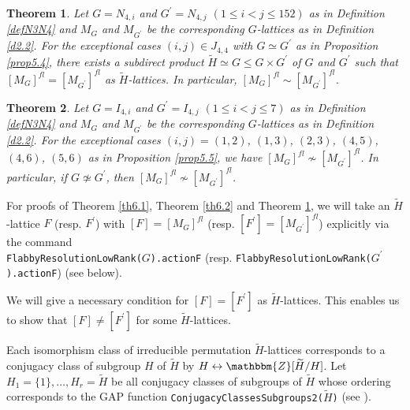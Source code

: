 \documentclass{amsart}
\theoremstyle{plain}
\newtheorem{theorem}{Theorem}[section]
\theoremstyle{definition}
\theoremstyle{remark}
\newcommand{\bZ}{\mathbbm{Z}}\newcommand{\bQ}{\mathbbm{Q}}
\newcounter{sub}\def\tr{\mbox{tr }}
\begin{document}
\begin{theorem}\label{th6.3}
Let $G=N_{4,i}$ and $G^\prime=N_{4,j}$ $(1\leq i<j\leq 152)$ 
as in Definition \ref{defN3N4} 
and $M_G$ and $M_{G^\prime}$ 
be the corresponding $G$-lattices as in Definition \ref{d2.2}. 
For the exceptional cases $(i,j)\in J_{4,4}$ with $G\simeq G^\prime$ 
as in Proposition \ref{prop5.4}, 
there exists a subdirect product 
$\widetilde{H}\simeq G\leq G\times G^\prime$ of $G$ and $G^\prime$ 
such that $[M_G]^{fl}=[M_{G^\prime}]^{fl}$ as $\widetilde{H}$-lattices. 
In particular, $[M_G]^{fl}\sim [M_{G^\prime}]^{fl}$.
\end{theorem}

\begin{theorem}\label{th6.4}
Let $G=I_{4,i}$ and $G^\prime=I_{4,j}$ $(1\leq i<j\leq 7)$ 
as in Definition \ref{defN3N4} 
and $M_G$ and $M_{G^\prime}$ 
be the corresponding $G$-lattices as in Definition \ref{d2.2}. 
For the exceptional cases 
$(i,j)=(1,2)$, $(1,3)$, $(2,3)$, $(4,5)$, $(4,6)$, $(5,6)$ 
as in Proposition \ref{prop5.5}, 
we have $[M_G]^{fl}\not\sim [M_{G^\prime}]^{fl}$. 
In particular, if $G\not\simeq G^\prime$, 
then $[M_G]^{fl}\not\sim [M_{G^\prime}]^{fl}$. 
\end{theorem}
%

For proofs of Theorem \ref{th6.1}, Theorem \ref{th6.2} and 
Theorem \ref{th6.3}, 
we will take an $\widetilde{H}$-lattice $F$ (resp. $F^\prime$)
with $[F]=[M_G]^{fl}$ (resp. $[F^\prime]=[M_{G^\prime}]^{fl}$) 
explicitly via the command \\
{\tt FlabbyResolutionLowRank($G$).actionF} 
(resp. {\tt FlabbyResolutionLowRank($G^\prime$).actionF}) (see below). 

We will give a necessary condition for $[F]=[F^\prime]$ 
as $\widetilde{H}$-lattices. 
This enables us to show that 
$[F]\neq [F^\prime]$ for some $\widetilde{H}$-lattices. 

Each isomorphism class of irreducible permutation $\widetilde{H}$-lattices 
corresponds to a conjugacy class of subgroup $H$ of $\widetilde{H}$ by
$H \leftrightarrow \bZ[\widetilde{H}/H]$. 
Let $H_1=\{1\},\ldots,H_r=\widetilde{H}$ 
be all conjugacy classes of subgroups of $\widetilde{H}$ 
whose ordering corresponds to the GAP function 
{\tt ConjugacyClassesSubgroups2($\widetilde{H}$)} 
(see \cite[Section 4.1, page 42]{HY17}).\\ 
\end{document}
